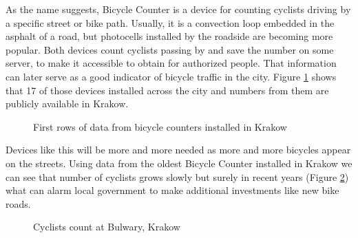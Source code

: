 As the name suggests, Bicycle Counter is a device for counting cyclists driving by a specific street or bike path. Usually, it is a convection loop embedded in the asphalt of a road, but photocells installed by the roadside are becoming more popular. Both devices count cyclists passing by and save the number on some server, to make it accessible to obtain for authorized people. That information can later serve as a good indicator of bicycle traffic in the city. Figure \ref{fig:countersKrakow} shows that 17 of those devices installed across the city and numbers from them are publicly available in Krakow.
\begin{figure}[H]
    \centering
    \caption{First rows of data from bicycle counters installed in Krakow \cite{liczniki}}
    \label{fig:countersKrakow}
\end{figure}
Devices like this will be more and more needed as more and more bicycles appear on the streets. Using data from the oldest Bicycle Counter installed in Krakow  \cite{liczniki} we can see that number of cyclists grows slowly but surely in recent years (Figure \ref{fig:graph3}) what can alarm local government to make additional investments like new bike roads.
\begin{figure}[H]
    \centering
    \caption{Cyclists count at Bulwary, Krakow}
    \label{fig:graph3}
\end{figure}
